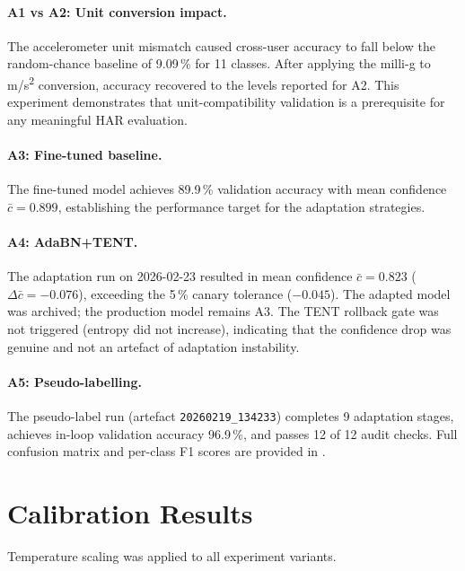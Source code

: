 \paragraph{A1 vs A2: Unit conversion impact.}
The accelerometer unit mismatch caused cross-user accuracy to fall below the
random-chance baseline of 9.09\,\% for 11 classes.
After applying the milli-g to m/s\textsuperscript{2} conversion, accuracy
recovered to the levels reported for A2.
This experiment demonstrates that unit-compatibility validation is a
prerequisite for any meaningful HAR evaluation.

\paragraph{A3: Fine-tuned baseline.}
The fine-tuned model achieves 89.9\,\% validation accuracy with mean confidence
$\bar{c} = 0.899$, establishing the performance target for the adaptation
strategies.

\paragraph{A4: AdaBN+TENT.}
The adaptation run on 2026-02-23 resulted in mean confidence
$\bar{c} = 0.823$ ($\Delta\bar{c} = -0.076$), exceeding the 5\,\% canary
tolerance ($-0.045$).
The adapted model was archived; the production model remains A3.
The TENT rollback gate was not triggered (entropy did not increase), indicating
that the confidence drop was genuine and not an artefact of adaptation instability.

\paragraph{A5: Pseudo-labelling.}
The pseudo-label run (artefact \texttt{20260219\_134233}) completes 9
adaptation stages, achieves in-loop validation accuracy 96.9\,\%, and passes
12 of 12 audit checks.
Full confusion matrix and per-class F1 scores are provided in
.

\section{Calibration Results}
\label{sec:calibration_results}

Temperature scaling was applied to all experiment variants.

